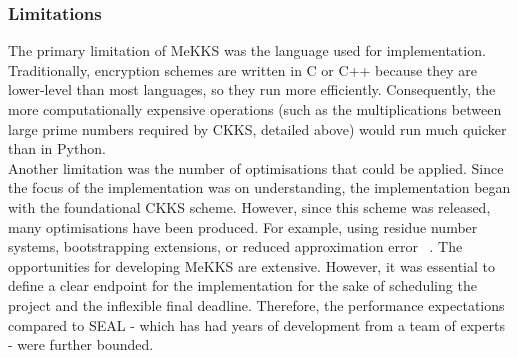 \setlength{\leftskip}{0cm}
\subsubsection{Limitations}
\label{sec:mekksLimitations}
\setlength{\leftskip}{0.5cm}
\indent \indent
The primary limitation of MeKKS was the language used for implementation. Traditionally, encryption schemes are written in C or C++ because they are lower-level than most languages, so they run more efficiently. Consequently, the more computationally expensive operations (such as the multiplications between large prime numbers required by CKKS, detailed above) would run much quicker than in Python. 
\smallskip \\ \indent
Another limitation was the number of optimisations that could be applied. Since the focus of the implementation was on understanding, the implementation began with the foundational CKKS scheme. However, since this scheme was released, many optimisations have been produced. For example, using residue number systems, bootstrapping extensions, or reduced approximation error ~\cite{RNS,BootstrappingHEAAN, RAE}. The opportunities for developing MeKKS are extensive. However, it was essential to define a clear endpoint for the implementation for the sake of scheduling the project and the inflexible final deadline. Therefore, the performance expectations compared to SEAL - which has had years of development from a team of experts - were further bounded.

\setlength{\leftskip}{0cm}
